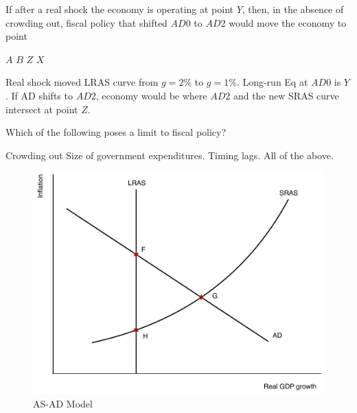 \documentclass[addpoints,11pt]{exam}
\theoremstyle{definition}
\begin{document}
\begin{questions}
If after a real shock the economy is operating at point $Y$, then, in the absence of crowding out, fiscal policy that shifted $AD0$ to $AD2$ would move the economy to point

\begin{choices}
	\choice $A$
	\choice $B$
	\CorrectChoice $Z$
	\choice $X$
\end{choices}

\begin{solution}
	Real shock moved LRAS curve from $g=2\%$ to $g=1\%$. Long-run Eq at $AD0$ is $Y$. If AD shifts to $AD2$, economy would be where $AD2$ and the new SRAS curve intersect at point $Z$.
\end{solution}


\question Which of the following poses a limit to fiscal policy?

\begin{choices}
	\choice Crowding out
	\choice Size of government expenditures.
	\choice Timing lags.
	\CorrectChoice All of the above.
\end{choices}

\question 




\begin{figure}[H]
	\centering
	\includegraphics[scale=.38]{Final_MC14.pdf}
	\caption{AS-AD Model}
	\label{MC14}
\end{figure}


\end{questions}
\end{document}
